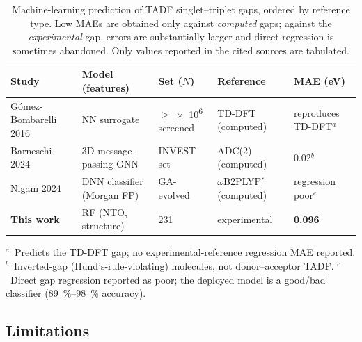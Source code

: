 \begin{table}[htbp]
  \centering
  \caption{Machine-learning prediction of TADF singlet--triplet gaps, ordered by
    reference type. Low MAEs are obtained only against \emph{computed} gaps;
    against the \emph{experimental} gap, errors are substantially larger and
    direct regression is sometimes abandoned. Only values reported in the
    cited sources are tabulated.}
  \label{tab:prior_ml}
  \small
  \begin{tabular}{lllll}
    \toprule
    Study & Model (features) & Set ($N$) & Reference & MAE (eV) \\
    \midrule
    G\'omez-Bombarelli 2016~\cite{Gomez-Bombarelli2016} & NN surrogate & $>$\num{e6} screened & TD-DFT (computed) & reproduces TD-DFT$^{a}$ \\
    Barneschi 2024~\cite{Barneschi2024} & 3D message-passing GNN & INVEST set & ADC(2) (computed) & 0.02$^{b}$ \\
    Nigam 2024~\cite{Nigam2024} & DNN classifier (Morgan FP) & GA-evolved & $\omega$B2PLYP$'$ (computed) & regression poor$^{c}$ \\
    \textbf{This work} & RF (NTO, structure) & 231 & experimental & \textbf{0.096} \\
    \bottomrule
  \end{tabular}

  \vspace{2pt}
  {\footnotesize\raggedright
   $^{a}$~Predicts the TD-DFT gap; no experimental-reference regression MAE reported.
   $^{b}$~Inverted-gap (Hund's-rule-violating) molecules, not donor--acceptor TADF.
   $^{c}$~Direct gap regression reported as poor; the deployed model is a good/bad
   classifier (\qtyrange{89}{98}{\percent} accuracy).\par}
\end{table}

\subsection{Limitations}\label{subsec:limitations}

